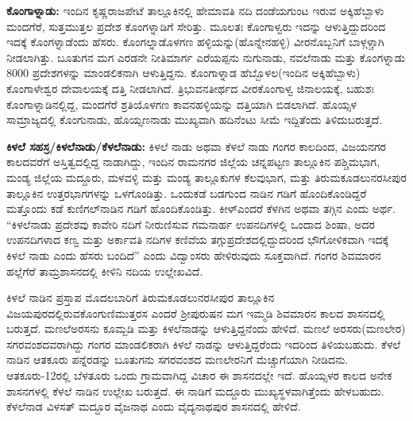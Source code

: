 \textbf{ಕೊಂಗಾಳ್ನಾಡು:} ಇಂದಿನ ಕೃಷ್ಣರಾಜಪೇಟೆ ತಾಲ್ಲೂಕಿನಲ್ಲಿ ಹೇಮಾವತಿ ನದಿ ದಂಡೆಯಗುಂಟ ಇರುವ ಅಕ್ಕಿಹೆಬ್ಬಾಳು ಮಂದಗೆರೆ, ಸುತ್ತಮುತ್ತಲ ಪ್ರದೇಶ ಕೊಂಗಳ್ನಾಡಿಗೆ ಸೇರಿತ್ತು. ಮೂಲತಃ ಕೊಂಗಾಳ್ವರು ಇದನ್ನು ಆಳುತ್ತಿದ್ದುದರಿಂದ ಇದಕ್ಕೆ ಕೊಂಗಳ್ನಾಡೆಂದು ಹೆಸರು. ಕೊಂಗಲ್ನಾಡೊಳಗಣ ಹಳ್ಳಿಯನ್ನು(ಹೊನ್ನೇನಹಳ್ಳಿ) ವೀರನೊಬ್ಬನಿಗೆ ಬಾಳ್ಗಳ್ಚಾಗಿ ನೀಡಲಾಗಿತ್ತು. ಬೂತುಗನ ಮಗ ಎರಡನೇ ನೀತಿಮಾರ್ಗ ಎರೆಯಪ್ಪನು ನುಗುನಾಡು, ನವಲೆನಾಡು ಮತ್ತು ಕೊಂಗಳ್ನಾಡು 8000 ಪ್ರದೇಶಗಳನ್ನು ಮಾಂಡಲಿಕನಾಗಿ ಆಳುತ್ತಿದ್ದನು. ಕೊಂಗಾಳ್ನಾಡ ಹೆಬ್ಬೊಳಲ(ಇಂದಿನ ಅಕ್ಕಿಹೆಬ್ಬಾಳು) ಕೊಂಗಾಳೇಶ್ವರ ದೇವಾಲಯಕ್ಕೆ ದತ್ತಿ ನೀಡಲಾಗಿದೆ. ತ್ರಿಭುವನತೀರ್ಥದ ವೀರಕೊಂಗಾಳ್ವ ಜಿನಾಲಯಕ್ಕೆ, ಬಹುಶಃ ಕೊಂಗಾಳ್ನಾಡಿನಲ್ಲಿದ್ದ, ಮಂದಗೆರೆ ಶ್ರತಿಯೊಳಗಣ ಕಾವನಹಳ್ಳಿಯನ್ನು ದತ್ತಿಯಾಗಿ ಬಿಡಲಾಗಿದೆ. ಹೊಯ್ಸಳ ಸಾಮ್ರಾಜ್ಯದಲ್ಲಿ ಕೊಂಗುನಾಡು, ಹೊಯ್ಸಣನಾಡು ಮುಖ್ಯವಾಗಿ ಹದಿನೆಂಟು ಸೀಮೆ ಇದ್ದಿತೆಂದು ತಿಳಿದುಬರುತ್ತದೆ.

\textbf{ಕಿಳಲೆ ಸಹಸ್ರ/ಕಿಳಲೆನಾಡು/ಕೆಳಲೆನಾಡು: } ಕಿಳಲೆ ನಾಡು ಅಥವಾ ಕೆಳಲೆ ನಾಡು ಗಂಗರ ಕಾಲದಿಂದ, ವಿಜಯನಗರ ಕಾಲದವರೆಗೆ ಅಸ್ತಿತ್ವದಲ್ಲಿದ್ದ ನಾಡಾಗಿದ್ದು, ಇಂದಿನ ರಾಮನಗರ ಜಿಲ್ಲೆಯ ಚನ್ನಪಟ್ಟಣ ತಾಲ್ಲೂಕಿನ ಪಶ್ಚಿಮಭಾಗ, ಮಂಡ್ಯ ಜಿಲ್ಲೆಯ ಮದ್ದೂರು, ಮಳವಳ್ಳಿ ಮತ್ತು ಮಂಡ್ಯ ತಾಲ್ಲೂಕುಗಳ ಕೆಲವುಭಾಗ, ಮತ್ತು ತಿರುಮಕೂಡಲುನರಸೀಪುರ ತಾಲ್ಲೂಕಿನ ಉತ್ತರಭಾಗಗಳನ್ನು ಒಳಗೊಂಡಿತ್ತು. ಒಂದುಕಡೆ ಬಡಗುಂದ ನಾಡಿನ ಗಡಿಗೆ ಹೊಂದಿಕೊಂಡಿದ್ದರೆ ಮತ್ತೊಂದು ಕಡೆ ಕುಣಿಗಲ್​ನಾಡಿನ ಗಡಿಗೆ ಹೊಂದಿಕೊಂಡಿತ್ತು. ಕೀಳ್​ ಎಂದರೆ ಕೆಳಗಿನ ಅಥವಾ ತಗ್ಗಿನ ಎಂದು ಅರ್ಥ. “ಕಿಳಲೆನಾಡು ಪ್ರದೇಶವು ಕಾವೇರಿ ನದಿಗೆ ನೀರುಣಿಸುವ ಗಮನಾರ್ಹ ಉಪನದಿಗಳಲ್ಲಿ ಒಂದಾದ ಶಿಂಷಾ, ಅದರ ಉಪನದಿಗಳಾದ ಕಣ್ವ ಮತ್ತು ಅರ್ಕಾವತಿ ನದಿಗಳ ಕಣಿವೆಯ ತಗ್ಗುಪ್ರದೇಶದಲ್ಲಿದ್ದುದರಿಂದ ಭೌಗೋಳಿಕವಾಗಿ ಇದಕ್ಕೆ ಕಿಳಲೆ ನಾಡು ಎಂದು ಹೆಸರು ಬಂದಿದೆ” ಎಂದು ವಿದ್ವಾಂಸರು ಹೇಳಿರುವುದು ಸೂಕ್ತವಾಗಿದೆ. ಗಂಗರ ಶಿವಮಾರನ ಹಲ್ಲೆಗೆರೆ ತಾಮ್ರಶಾಸನದಲ್ಲಿ ಕೀಳಿನಿ ನದಿಯ ಉಲ್ಲೇಖವಿದೆ.

ಕಿಳಲೆ ನಾಡಿನ ಪ್ರಸ್ತಾಪ ಮೊದಲಬಾರಿಗೆ ತಿರುಮಕೂಡಲುನರಸೀಪುರ ತಾಲ್ಲೂಕಿನ ವಿಜಯಪುರದಲ್ಲಿರುವ\break ಕೊಂಗುಣಿಮುತ್ತರಸ ಎಂದರೆ ಶ‍್ರೀಪುರುಷನ ಮಗ ಇಮ್ಮಡಿ ಶಿವಮಾರನ ಕಾಲದ ಶಾಸನದಲ್ಲಿ ಬರುತ್ತದೆ. ಮಣಲೆಅರಸನು ಕೂಮ್ಬಡಿ ಮತ್ತು ಕಿಳಲೆನಾಡನ್ನು ಆಳುತ್ತಿದ್ದನೆಂದು ಹೇಳಿದೆ. ಮಣಲೆ ಅರಸರು(ಮಣಲೇರ) ಸಗರವಂಶದವರಾಗಿದ್ದು ಗಂಗರ ಮಾಂಡಲಿಕರಾಗಿ ಕಿಳಲೆ ನಾಡನ್ನು ಆಳುತ್ತಿದ್ದರೆಂದು ಇದರಿಂದ ತಿಳಿಯಬಹುದು. ಕೆಳಲೆ ನಾಡಿನ ಆತಕೂರು ಪನ್ನೆರಡನ್ನು ಬೂತುಗನು ಸಗರವಂಶದ ಮಣಲೇರನಿಗೆ ಮೆಚ್ಚುಗೆಯಾಗಿ ನೀಡಿದನು. ಆತಕೂರು-12ರಲ್ಲಿ ಬೆಳತೂರು ಒಂದು ಗ್ರಾಮವಾಗಿದ್ದ ವಿಚಾರ ಈ ಶಾಸನದಲ್ಲೇ ಇದೆ. ಹೊಯ್ಸಳರ ಕಾಲದ ಅನೇಕ ಶಾಸನಗಳಲ್ಲಿ ಕೆಳಲೆ ನಾಡಿನ ಉಲ್ಲೇಖ ಬರುತ್ತದೆ. ಈ ನಾಡಿಗೆ ಮದ್ದೂರು ಮುಖ್ಯಸ್ಥಳವಾಗಿತ್ತೆಂದು ಹೇಳಬಹುದು. ಕೆಳಲೆನಾಡ ವಿಳಸತ್​ ಮದ್ದೂರ ವೈಜನಾಥ ಎಂದು ವೈದ್ಯನಾಥಪುರ ಶಾಸನದಲ್ಲಿ ಹೇಳಿದೆ.

